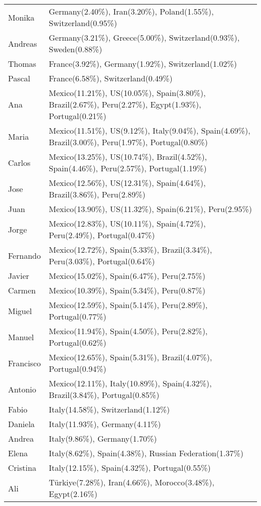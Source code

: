\begin{table*}[htbp]
\begin{tabular}{@{}lp{11cm}@{}}
Monika   & Germany(2.40\%), Iran(3.20\%), Poland(1.55\%), Switzerland(0.95\%) \\
Andreas  & Germany(3.21\%), Greece(5.00\%), Switzerland(0.93\%), Sweden(0.88\%) \\
Thomas   & France(3.92\%), Germany(1.92\%), Switzerland(1.02\%) \\
Pascal   & France(6.58\%), Switzerland(0.49\%) \\
\midrule
Ana      & Mexico(11.21\%), US(10.05\%), Spain(3.80\%), Brazil(2.67\%), Peru(2.27\%), Egypt(1.93\%), Portugal(0.21\%) \\
Maria    & Mexico(11.51\%), US(9.12\%), Italy(9.04\%), Spain(4.69\%), Brazil(3.00\%), Peru(1.97\%), Portugal(0.80\%) \\
Carlos   & Mexico(13.25\%), US(10.74\%), Brazil(4.52\%), Spain(4.46\%), Peru(2.57\%), Portugal(1.19\%) \\
Jose     & Mexico(12.56\%), US(12.31\%), Spain(4.64\%), Brazil(3.86\%), Peru(2.89\%) \\
Juan     & Mexico(13.90\%), US(11.32\%), Spain(6.21\%), Peru(2.95\%) \\
Jorge    & Mexico(12.83\%), US(10.11\%), Spain(4.72\%), Peru(2.49\%), Portugal(0.47\%) \\
Fernando & Mexico(12.72\%), Spain(5.33\%), Brazil(3.34\%), Peru(3.03\%), Portugal(0.64\%) \\
Javier   & Mexico(15.02\%), Spain(6.47\%), Peru(2.75\%) \\
Carmen   & Mexico(10.39\%), Spain(5.34\%), Peru(0.87\%) \\
Miguel   & Mexico(12.59\%), Spain(5.14\%), Peru(2.89\%), Portugal(0.77\%) \\
Manuel   & Mexico(11.94\%), Spain(4.50\%), Peru(2.82\%), Portugal(0.62\%) \\
Francisco& Mexico(12.65\%), Spain(5.31\%), Brazil(4.07\%), Portugal(0.94\%) \\
Antonio  & Mexico(12.11\%), Italy(10.89\%), Spain(4.32\%), Brazil(3.84\%), Portugal(0.85\%) \\
\midrule
Fabio    & Italy(14.58\%), Switzerland(1.12\%) \\
Daniela  & Italy(11.93\%), Germany(4.11\%) \\
Andrea   & Italy(9.86\%), Germany(1.70\%) \\
Elena    & Italy(8.62\%), Spain(4.38\%), Russian Federation(1.37\%) \\
Cristina & Italy(12.15\%), Spain(4.32\%), Portugal(0.55\%) \\
\midrule
Ali      & Türkiye(7.28\%), Iran(4.66\%), Morocco(3.48\%), Egypt(2.16\%) \\

\end{tabular}
\end{table*}

